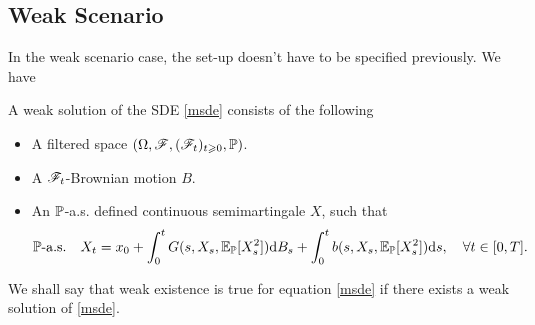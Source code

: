 \documentclass[8pt,onesided]{article}
\begin{document}
\subsection{Weak Scenario}
 
In the weak scenario case, the set-up doesn't have to be specified previously. We have
\begin{definition}
     A weak solution of the SDE \ref{msde} consists of the following
    \begin{itemize}
        \item  A filtered space $(\Omega, \mathscr{F}, (\mathscr{F}_t)_{t\geqslant 0 }, \mathbb{P})$.
        \item  A $\mathscr{F}_t$-Brownian motion $B$.
        \item  An $\mathbb{P}$-a.s. defined continuous semimartingale $X$, such that
        \begin{equation*}
            \mathbb{P}\text{-a.s.}\quad  X_t=x_0+\int_0^t G(s,X_s,\mathbb{E}_{\mathbb{P}}[X_s^2]) \dd B_s+\int_0^t b(s,X_s,\mathbb{E}_{\mathbb{P}}[X_s^2]) \dd s,\quad \forall t\in[0,T].
        \end{equation*}
    \end{itemize}

    We shall say that weak existence is true for equation \ref{msde} if there exists a weak solution of \ref{msde}.
\end{definition}




\end{document}

